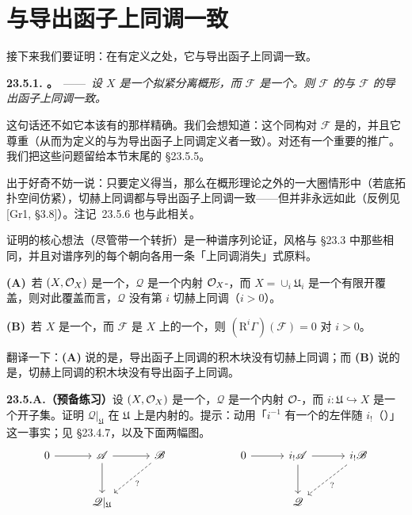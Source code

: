 
\section{\trCechCohomology{}与导出函子上同调一致}

接下来我们要证明：在\trCechCohomology{}有定义之处，它与导出函子上同调一致。

\textbf{23.5.1. \trhTheorem。}\ ——\ \emph{设 $X$ 是一个拟紧分离概形，而 $\mathscr{F}$ 是一个\trQCSheaf。则 $\mathscr{F}$ 的\trCechCohomology{}与 $\mathscr{F}$ 的导出函子上同调一致。}

这句话还不如它本该有的那样精确。我们会想知道：这个同构对 $\mathscr{F}$ 是\trFunctoriality{}的，并且它尊重\trLongExactSequence（从而为\trCechCohomology{}定义的\trConnectingHomomorphism{}与为导出函子上同调定义者一致）。对\trHigherPushforward{}还有一个重要的推广。我们把这些问题留给本节末尾的 \S23.5.5。

出于好奇不妨一说：只要定义得当，那么在概形理论之外的一大圈情形中（若底拓扑空间仿紧），切赫上同调都与导出函子上同调一致——但并非永远如此（反例见 [Gr1, \S3.8]）。\mbox{注记~23.5.6} 也与此相关。

证明的核心想法（尽管带一个转折）是一种谱序列论证，风格与 \S23.3 中那些相同，并且对谱序列的每个朝向各用一条「上同调消失」式原料。

\textbf{(A)}~若 $(X,\mathcal{O}_X)$ 是一个\trRingedSpace，$\mathscr{Q}$ 是一个内射 $\mathcal{O}_X$-\trModule，而 $X=\cup_i\mathfrak{U}_i$ 是一个有限开覆盖，则对此覆盖而言，$\mathscr{Q}$ 没有第 $i$ 切赫上同调（$i>0$）。

\textbf{(B)}~若 $X$ 是一个\trAffineScheme，而 $\mathscr{F}$ 是 $X$ 上的一个\trQCSheaf，则 $(\mathrm{R}^i\Gamma)(\mathscr{F})=0$ 对 $i>0$。

翻译一下：\textbf{(A)} 说的是，导出函子上同调的积木块没有切赫上同调；而 \textbf{(B)} 说的是，切赫上同调的积木块没有导出函子上同调。

\textbf{23.5.A.（预备练习）}\quad 设 $(X,\mathcal{O}_X)$ 是一个\trRingedSpace，$\mathscr{Q}$ 是一个内射 $\mathcal{O}$-\trModule，而 $i\colon\mathfrak{U}\hookrightarrow X$ 是一个开子集。证明 $\mathscr{Q}|_\mathfrak{U}$ 在 $\mathfrak{U}$ 上是内射的。提示：动用「$i^{-1}$ 有一个\trExact{}的左伴随 $i_!$（\trExtensionByZero）」这一事实；见 \S23.4.7，以及下面两幅图。
\[
\begin{tikzcd}[row sep=2.6em, column sep=3em]
0 \ar[r] & \mathscr{A} \ar[r] \ar[d] & \mathscr{B} \ar[dl, dashed, "?"] & & 0 \ar[r] & i_!\mathscr{A} \ar[r] \ar[d] & i_!\mathscr{B} \ar[dl, dashed, "?"] \\
 & \mathscr{Q}|_\mathfrak{U} & & & & \mathscr{Q} &
\end{tikzcd}
\]

